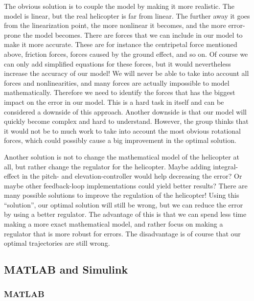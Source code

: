 \documentclass[../main.tex]{subfiles}
\begin{document}
The obvious solution is to couple the model by making it more realistic. The model is linear, but the real helicopter is far from linear. The further away it goes from the linearization point, the more nonlinear it becomes, and the more error-prone the model becomes. There are forces that we can include in our model to make it more accurate. These are for instance the centripetal force mentioned above, friction forces, forces caused by the ground effect, and so on. Of course we can only add simplified equations for these forces, but it would nevertheless increase the accuracy of our model! We will never be able to take into account all forces and nonlinearities, and many forces are actually impossible to model mathematically. Therefore we need to identify the forces that has the biggest impact on the error in our model. This is a hard task in itself and can be considered a downside of this approach. Another downside is that our model will quickly become complex and hard to understand. However, the group thinks that it would not be to much work to take into account the most obvious rotational forces, which could possibly cause a big improvement in the optimal solution.

Another solution is not to change the mathematical model of the helicopter at all, but rather change the regulator for the helicopter. Maybe adding integral-effect in the pitch- and elevation-controller would help decreasing the error? Or maybe other feedback-loop implementations could yield better results? There are many possible solutions to improve the regulation of the helicopter! Using this ``solution'', our optimal solution will still be wrong, but we can reduce the error by using a better regulator. The advantage of this is that we can spend less time making a more exact mathematical model, and rather focus on making a regulator that is more robust for errors. The disadvantage is of course that our optimal trajectories are still wrong.

\subsection{MATLAB and Simulink}
\subsubsection{MATLAB}

\end{document}

